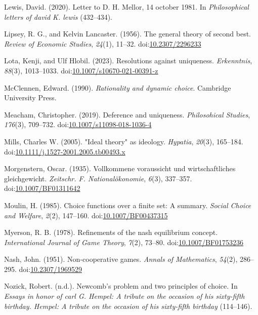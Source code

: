 \documentclass[
  12pt,
  letterpaper,
  DIV=11,
  numbers=noendperiod]{scrreprt}
\newlength{\cslhangindent}
\newenvironment{CSLReferences}[2] %
 {\begin{list}{}{%
  \setlength{\itemindent}{0pt}
  \setlength{\leftmargin}{0pt}
  \setlength{\parsep}{0pt}
  \ifodd #1
   \setlength{\leftmargin}{\cslhangindent}
   \setlength{\itemindent}{-1\cslhangindent}
  \fi
  \setlength{\itemsep}{#2\baselineskip}}}
 {\end{list}}
\begin{document}
\begin{CSLReferences}{1}{0}
Lewis, David. (2020). Letter to {D}. H. Mellor, 14 october 1981. In
\emph{Philosophical letters of david {K}. lewis} (432--434).

Lipsey, R. G., and Kelvin Lancaster. (1956). The general theory of
second best. \emph{Review of Economic Studies}, \emph{24}(1), 11--32.
doi:\href{https://doi.org/10.2307/2296233}{10.2307/2296233}

Lota, Kenji, and Ulf Hlobil. (2023). Resolutions against uniqueness.
\emph{Erkenntnis}, \emph{88}(3), 1013--1033.
doi:\href{https://doi.org/10.1007/s10670-021-00391-z}{10.1007/s10670-021-00391-z}

McClennen, Edward. (1990). \emph{Rationality and dynamic choice}.
{C}ambridge {U}niversity {P}ress.

Meacham, Christopher. (2019). Deference and uniqueness.
\emph{Philosohical Studies}, \emph{176}(3), 709--732.
doi:\href{https://doi.org/10.1007/s11098-018-1036-4}{10.1007/s11098-018-1036-4}

Mills, Charles W. (2005). "Ideal theory" as ideology. \emph{Hypatia},
\emph{20}(3), 165--184.
doi:\href{https://doi.org/10.1111/j.1527-2001.2005.tb00493.x}{10.1111/j.1527-2001.2005.tb00493.x}

Morgenstern, Oscar. (1935). Vollkommene voraussicht und wirtschaftliches
gleichgewicht. \emph{Zeitschr. F. National{ö}konomie}, \emph{6}(3),
337--357.
doi:\href{https://doi.org/10.1007/BF01311642}{10.1007/BF01311642}

Moulin, H. (1985). Choice functions over a finite set: A summary.
\emph{Social Choice and Welfare}, \emph{2}(2), 147--160.
doi:\href{https://doi.org/10.1007/BF00437315}{10.1007/BF00437315}

Myerson, R. B. (1978). Refinements of the nash equilibrium concept.
\emph{International Journal of Game Theory}, \emph{7}(2), 73--80.
doi:\href{https://doi.org/10.1007/BF01753236}{10.1007/BF01753236}

Nash, John. (1951). Non-cooperative games. \emph{Annals of Mathematics},
\emph{54}(2), 286--295.
doi:\href{https://doi.org/10.2307/1969529}{10.2307/1969529}

Nozick, Robert. (n.d.). Newcomb's problem and two principles of choice.
In \emph{Essays in honor of carl {G}. Hempel: A tribute on the occasion
of his sixty-fifth birthday. Hempel: A tribute on the occasion of his
sixty-fifth birthday} (114--146).


\end{CSLReferences}
\end{document}

